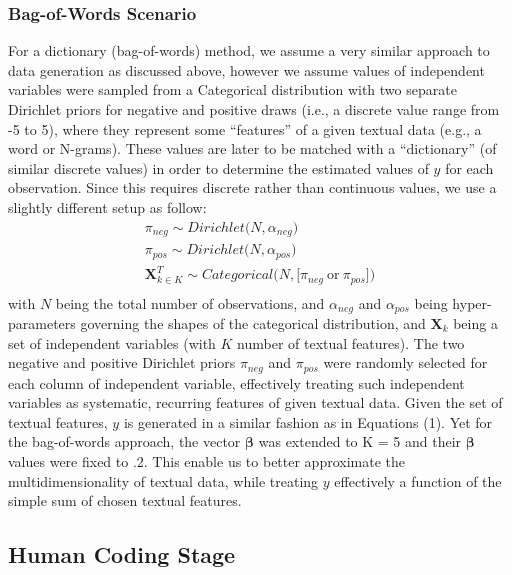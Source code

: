 \documentclass[man, 12pt, a4paper, nolmodern, noextraspace]{apa6}
\begin{document}
    \subsubsection{Bag-of-Words Scenario}
     For a dictionary (bag-of-words) method, we assume a very similar approach to data generation as discussed above, however we assume values of independent variables were sampled from a Categorical distribution with two separate Dirichlet priors for negative and positive draws (i.e., a discrete value range from -5 to 5), where they represent some \enquote{features} of a given textual data (e.g., a word or N-grams). These values are later to be matched with a \enquote{dictionary} (of similar discrete values) in order to determine the estimated values of $y$ for each observation. Since this requires discrete rather than continuous values, we use a slightly different setup as follow:
       \begin{equation}
        \begin{gathered}
            \pi_{neg} \sim Dirichlet\bigl(N, \alpha_{neg}\bigr) \\
            \pi_{pos} \sim Dirichlet\bigl(N, \alpha_{pos}\bigr) \\
            \boldsymbol{X}_{k \in K}^T \sim Categorical\bigl(N, \bigl[\pi_{neg}\ \textrm{or}\ \pi_{pos}\bigr]\bigr) \\
        \end{gathered}
    \end{equation}
    \noindent with $N$ being the total number of observations, and $\alpha_{neg}$ and $\alpha_{pos}$ being hyper-parameters governing the shapes of the categorical distribution, and $\boldsymbol{X}_k$ being a set of independent variables (with $K$ number of textual features). The two negative and positive Dirichlet priors $\pi_{neg}$ and $\pi_{pos}$ were randomly selected for each column of independent variable, effectively treating such independent variables as systematic, recurring features of given textual data. Given the set of textual features, $y$ is generated in a similar fashion as in Equations (1). Yet for the bag-of-words approach, the vector $\boldsymbol{\beta}$ was extended to K = 5 and their $\boldsymbol{\beta}$ values were fixed to .2. This enable us to better approximate the multidimensionality of textual data, while treating $y$ effectively a function of the simple sum of chosen textual features. 

    \subsection{Human Coding Stage}
    
\end{document}
